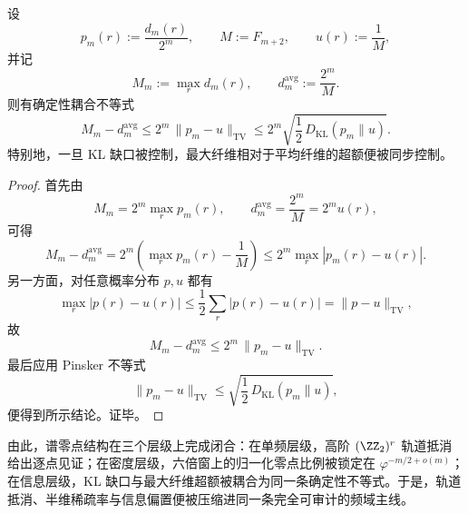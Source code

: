 \begin{theorem}\label{thm:xi-time-part70c-kl-gap-controls-maxfiber-excess}
设
\[
p_m(r):=\frac{d_m(r)}{2^m},
\qquad
M:=F_{m+2},
\qquad
u(r):=\frac1M,
\]
并记
\[
M_m:=\max_r d_m(r),
\qquad
d_m^{\mathrm{avg}}:=\frac{2^m}{M}.
\]
则有确定性耦合不等式
\[
\boxed{\;
M_m-d_m^{\mathrm{avg}}
\le
2^m\,\|p_m-u\|_{\mathrm{TV}}
\le
2^m\sqrt{\frac12\,D_{\mathrm{KL}}(p_m\|u)}.\;}
\]
特别地，一旦 KL 缺口被控制，最大纤维相对于平均纤维的超额便被同步控制。
\end{theorem}
\begin{proof}
首先由
\[
M_m=2^m\max_r p_m(r),
\qquad
d_m^{\mathrm{avg}}=\frac{2^m}{M}=2^m u(r),
\]
可得
\[
M_m-d_m^{\mathrm{avg}}
=
2^m\left(\max_r p_m(r)-\frac1M\right)
\le
2^m\max_r|p_m(r)-u(r)|.
\]
另一方面，对任意概率分布 \(p,u\) 都有
\[
\max_r|p(r)-u(r)|
\le
\frac12\sum_r|p(r)-u(r)|
=
\|p-u\|_{\mathrm{TV}},
\]
故
\[
M_m-d_m^{\mathrm{avg}}
\le
2^m\,\|p_m-u\|_{\mathrm{TV}}.
\]
最后应用 Pinsker 不等式
\[
\|p_m-u\|_{\mathrm{TV}}
\le
\sqrt{\frac12\,D_{\mathrm{KL}}(p_m\|u)},
\]
便得到所示结论。证毕。
\end{proof}

\noindent
由此，谱零点结构在三个层级上完成闭合：在单频层级，高阶 \texorpdfstring{$(\ZZ_2)^r$}{(Z2)r} 轨道抵消给出逐点见证；在密度层级，六倍窗上的归一化零点比例被锁定在 \(\varphi^{-m/2+o(m)}\)；在信息层级，KL 缺口与最大纤维超额被耦合为同一条确定性不等式。于是，轨道抵消、半维稀疏率与信息偏置便被压缩进同一条完全可审计的频域主线。

\endinput
